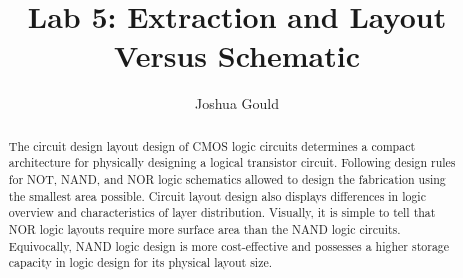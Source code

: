 \documentclass[conference]{IEEEtran}
\begin{document}
\title{Lab 5: Extraction and Layout Versus Schematic }
\author{
Joshua Gould\\
}
\maketitle

\IEEEpeerreviewmaketitle

\begin{abstract}
The circuit design layout design of CMOS logic circuits determines a compact architecture for physically designing a logical transistor circuit. Following design rules for NOT, NAND, and NOR logic schematics allowed to design the fabrication using the smallest area possible. Circuit layout design also displays differences in logic overview and characteristics of layer distribution. Visually, it is simple to tell that NOR logic layouts require more surface area than the NAND logic circuits. Equivocally, NAND logic design is more cost-effective and possesses a higher storage capacity in logic design for its physical layout size.
\end{abstract}


\end{document}
